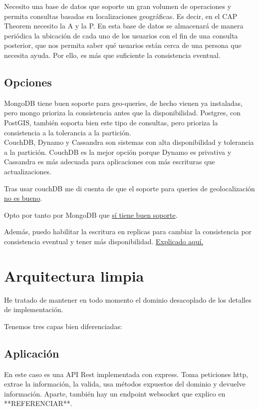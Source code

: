 Necesito una base de datos que soporte un gran volumen de operaciones y permita consultas basadas en localizaciones geográficas. Es decir, en el CAP Theorem necesito la A y la P.
En esta base de datos se almacenará de manera periódica la ubicación de cada uno de los usuarios con el fin de una consulta posterior, que nos permita saber qué usuarios
están cerca de una persona que necesita ayuda. Por ello, es más que suficiente la consistencia eventual.

\subsection{Opciones}

MongoDB tiene buen soporte para geo-queries, de hecho vienen ya instaladas, pero mongo prioriza la consistencia antes que la disponibilidad. Postgres, con PostGIS, también soporta bien
este tipo de consultas, pero prioriza la consistencia a la tolerancia a la partición. \\
CouchDB, Dynamo y Cassandra son sistemas con alta disponibilidad y tolerancia a la partición. CouchDB es la mejor opción porque Dynamo es privativa y Cassandra es más adecuada para aplicaciones con más
escrituras que actualizaciones. 

Tras usar couchDB me di cuenta de que el soporte para queries de geolocalización \href{https://docs.couchdb.org/en/stable/ddocs/search.html?highlight=geospatial#geographical-searches}{no es bueno}.

Opto por tanto por MongoDB que \href{https://stackoverflow.com/questions/25734092/query-locations-within-a-radius-in-mongodb}{sí tiene buen soporte}.

Además, puedo habilitar la escritura en replicas para cambiar la consistencia por consistencia eventual y tener más disponibilidad. \href{https://stackoverflow.com/questions/11292215/where-does-mongodb-stand-in-the-cap-theorem}{Explicado aquí.}

\section{Arquitectura limpia}

He tratado de mantener en todo momento el dominio desacoplado de los detalles de implementación.

Tenemos tres capas bien diferenciadas:
\subsection{Aplicación}
En este caso es una API Rest implementada con express. Toma peticiones http, extrae la información, la valida, usa métodos expuestos del dominio y devuelve información.
Aparte, también hay un endpoint websocket que explico en **REFERENCIAR**.
